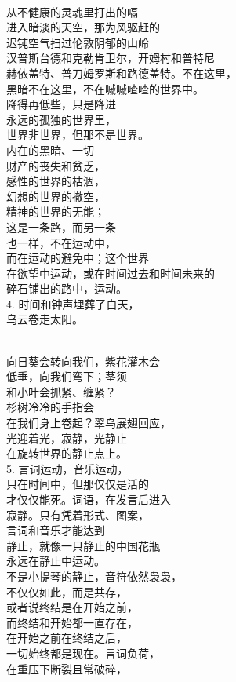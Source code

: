 \documentclass{article}
\begin{document}
\newpage 


\\
从不健康的灵魂里打出的嗝\\
进入暗淡的天空，那为风驱赶的\\
迟钝空气扫过伦敦阴郁的山岭\\
汉普斯台德和克勒肯卫尔，开姆村和普特尼\\
赫依盖特、普刀姆罗斯和路德盖特。不在这里，\\
黑暗不在这里，不在嘁嘁喳喳的世界中。\\
降得再低些，只是降进\\
永远的孤独的世界里，\\
世界非世界，但那不是世界。\\
内在的黑暗、一切\\
财产的丧失和贫乏，\\
感性的世界的枯涸，\\
幻想的世界的撤空，\\
精神的世界的无能；\\
这是一条路，而另一条\\
也一样，不在运动中，\\
而在运动的避免中；这个世界\\
在欲望中运动，或在时间过去和时间未来的\\
碎石铺出的路中，运动。\\
4. 时间和钟声埋葬了白天，\\
乌云卷走太阳。

\newpage 


\\
向日葵会转向我们，紫花灌木会\\
低垂，向我们弯下；茎须\\
和小叶会抓紧、缠紧？\\
杉树冷冷的手指会\\
在我们身上卷起？翠鸟展翅回应，\\
光迎着光，寂静，光静止\\
在旋转世界的静止点上。\\
5. 言词运动，音乐运动，\\
只在时间中，但那仅仅是活的\\
才仅仅能死。词语，在发言后进入\\
寂静。只有凭着形式、图案，\\
言词和音乐才能达到\\
静止，就像一只静止的中国花瓶\\
永远在静止中运动。\\
不是小提琴的静止，音符依然袅袅，\\
不仅仅如此，而是共存，\\
或者说终结是在开始之前，\\
而终结和开始都一直存在，\\
在开始之前在终结之后，\\
一切始终都是现在。言词负荷，\\
在重压下断裂且常破碎，
\end{document}
